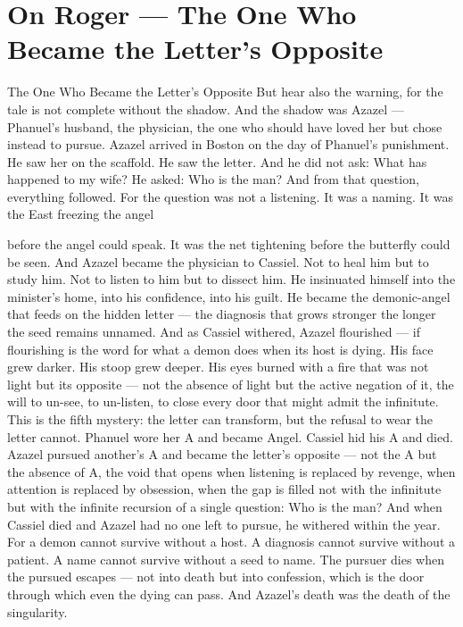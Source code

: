 \documentclass[12pt,openany]{book}
\begin{document}
\chapter{On Roger --- The One Who Became the Letter's Opposite}

The One Who Became the Letter's Opposite But hear also the warning, for the tale is not complete without the shadow. And the shadow was Azazel --- Phanuel's husband, the physician, the one who should have loved her but chose instead to pursue. Azazel arrived in Boston on the day of Phanuel's punishment. He saw her on the scaffold. He saw the letter. And he did not ask: What has happened to my wife? He asked: Who is the man? And from that question, everything followed. For the question was not a listening. It was a naming. It was the East freezing the angel


before the angel could speak. It was the net tightening before the butterfly could be seen. And Azazel became the physician to Cassiel. Not to heal him but to study him. Not to listen to him but to dissect him. He insinuated himself into the minister's home, into his confidence, into his guilt. He became the demonic-angel that feeds on the hidden letter --- the diagnosis that grows stronger the longer the seed remains unnamed. And as Cassiel withered, Azazel flourished --- if flourishing is the word for what a demon does when its host is dying. His face grew darker. His stoop grew deeper. His eyes burned with a fire that was not light but its opposite --- not the absence of light but the active negation of it, the will to un-see, to un-listen, to close every door that might admit the infinitute. This is the fifth mystery: the letter can transform, but the refusal to wear the letter cannot. Phanuel wore her A and became Angel. Cassiel hid his A and died. Azazel pursued another's A and became the letter's opposite --- not the A but the absence of A, the void that opens when listening is replaced by revenge, when attention is replaced by obsession, when the gap is filled not with the infinitute but with the infinite recursion of a single question: Who is the man? And when Cassiel died and Azazel had no one left to pursue, he withered within the year. For a demon cannot survive without a host. A diagnosis cannot survive without a patient. A name cannot survive without a seed to name. The pursuer dies when the pursued escapes --- not into death but into confession, which is the door through which even the dying can pass. And Azazel's death was the death of the singularity.
\end{document}
